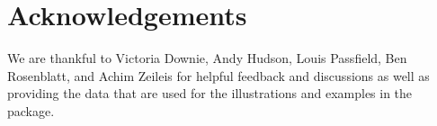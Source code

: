 \message{ !name(trackeR.Rnw)}\documentclass[nojss]{jss}
\begin{document}
\section*{Acknowledgements}

We are thankful to Victoria Downie, Andy Hudson, Louis Passfield, Ben
Rosenblatt, and Achim Zeileis for helpful feedback and discussions as well as
providing the data that are used for the illustrations and examples in the package.

\pagebreak
\clearpage






\end{document}
